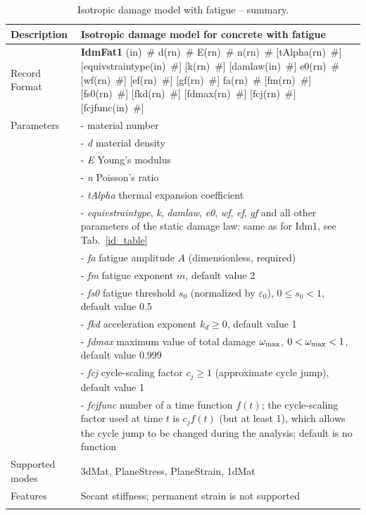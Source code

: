 \documentclass[a4paper]{article}
\newcommand{\descitem}[1]{{\noindent \bf #1}}
\newcommand{\elemparam}[2]{{{#1\tiny (#2)}~\#}}
\newcommand{\param}[1]{{\it #1}}
\begin{document}
\begin{longtable}{|l|p{9cm}|}
\hline
Description & Isotropic damage model for concrete with fatigue\\
\hline
Record Format & \descitem{IdmFat1}
\elemparam{}{in}
\elemparam{d}{rn}
\elemparam{E}{rn}
\elemparam{n}{rn}
[\elemparam{tAlpha}{rn}]
[\elemparam{equivstraintype}{in}]
[\elemparam{k}{rn}]
[\elemparam{damlaw}{in}]
\elemparam{e0}{rn}
[\elemparam{wf}{rn}]
[\elemparam{ef}{rn}]
[\elemparam{gf}{rn}]
\elemparam{fa}{rn}
[\elemparam{fm}{rn}]
[\elemparam{fs0}{rn}]
[\elemparam{fkd}{rn}]
[\elemparam{fdmax}{rn}]
[\elemparam{fcj}{rn}]
[\elemparam{fcjfunc}{in}]\\
Parameters &- \param{} material number\\
&- \param{d} material density\\
&- \param{E} Young's modulus\\
&- \param{n} Poisson's ratio\\
&- \param{tAlpha} thermal expansion coefficient\\
&- \param{equivstraintype}, \param{k}, \param{damlaw}, \param{e0}, \param{wf}, \param{ef}, \param{gf}
and all other parameters of the static damage law: same as for Idm1, see Tab.~\ref{id_table}\\
&- \param{fa} fatigue amplitude $A$ (dimensionless, required)\\
&- \param{fm} fatigue exponent $m$, default value 2\\
&- \param{fs0} fatigue threshold $s_0$ (normalized by $\varepsilon_0$), $0\le s_0<1$, default value 0.5\\
&- \param{fkd} acceleration exponent $k_d\ge 0$, default value 1\\
&- \param{fdmax} maximum value of total damage $\omega_{\rm max}$, $0<\omega_{\rm max}<1$, default value 0.999\\
&- \param{fcj} cycle-scaling factor $c_j\ge 1$ (approximate cycle jump), default value 1\\
&- \param{fcjfunc} number of a time function $f(t)$; the cycle-scaling factor used at time $t$ is $c_jf(t)$ (but at least 1), which allows the cycle jump to be changed during the analysis; default is no function\\
Supported modes& 3dMat, PlaneStress, PlaneStrain, 1dMat\\
Features & Secant stiffness; permanent strain is not supported\\
\hline
\caption{Isotropic damage model with fatigue -- summary.}
\label{idfat_table}
\end{longtable}
\end{document}
